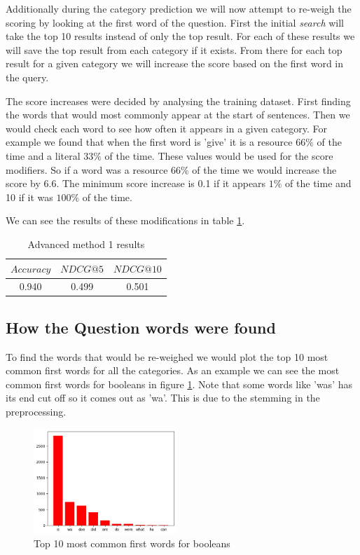 \documentclass[sigconf]{acmart}
\begin{document}
Additionally during the category prediction we will now attempt to re-weigh the scoring by looking at the first word of the question. First the initial \emph{search} will take the top 10 results instead of only the top result. For each of these results we will save the top result from each category if it exists. From there for each top result for a given category we will increase the score based on the first word in the query.

The score increases were decided by analysing the training dataset. First finding the words that would most commonly appear at the start of sentences. Then we would check each word to see how often it appears in a given category. For example we found that when the first word is 'give' it is a resource $66\%$ of the time and a literal $33\%$ of the time. These values would be used for the score modifiers. So if a word was a resource 66\% of the time we would increase the score by $6.6$. The minimum score increase is 0.1 if it appears $1\%$ of the time and 10 if it was $100\%$ of the time.

We can see the results of these modifications in table \ref{tab:advanced1_res}.

\begin{table}[h]
    \centering
    \caption{Advanced method 1 results}
    \begin{tabular}{c|c|c}
    $Accuracy$ & $NDCG@5$ & $NDCG@10$ \\
    \hline
    0.940 & 0.499 & 0.501
    \end{tabular}
    \label{tab:advanced1_res}
\end{table}

\subsection{How the Question words were found}
To find the words that would be re-weighed we would plot the top 10 most common first words for all the categories. As an example we can see the most common first words for booleans in figure \ref{figure:top10bool}. Note that some words like 'was' has its end cut off so it comes out as 'wa'. This is due to the stemming in the preprocessing. 

\begin{figure}[h]
    \includegraphics[width=0.48\textwidth]{figures/fwords.png}
    \caption{Top 10 most common first words for booleans}
    \label{figure:top10bool}
\end{figure}
\end{document}
